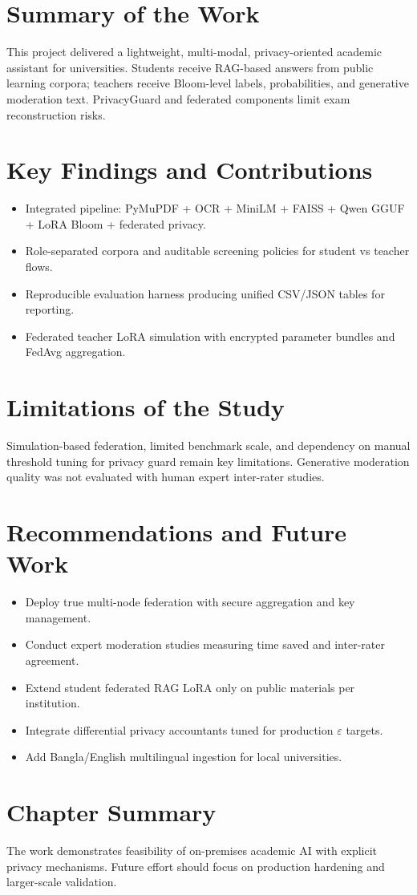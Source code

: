 
\section{Summary of the Work}
This project delivered a lightweight, multi-modal, privacy-oriented academic assistant for universities. Students receive RAG-based answers from public learning corpora; teachers receive Bloom-level labels, probabilities, and generative moderation text. PrivacyGuard and federated components limit exam reconstruction risks.

\section{Key Findings and Contributions}
\begin{itemize}
    \item Integrated pipeline: PyMuPDF + OCR + MiniLM + FAISS + Qwen GGUF + LoRA Bloom + federated privacy.
    \item Role-separated corpora and auditable screening policies for student vs teacher flows.
    \item Reproducible evaluation harness producing unified CSV/JSON tables for reporting.
    \item Federated teacher LoRA simulation with encrypted parameter bundles and FedAvg aggregation.
\end{itemize}

\section{Limitations of the Study}
Simulation-based federation, limited benchmark scale, and dependency on manual threshold tuning for privacy guard remain key limitations. Generative moderation quality was not evaluated with human expert inter-rater studies.

\section{Recommendations and Future Work}
\begin{itemize}
    \item Deploy true multi-node federation with secure aggregation and key management.
    \item Conduct expert moderation studies measuring time saved and inter-rater agreement.
    \item Extend student federated RAG LoRA only on public materials per institution.
    \item Integrate differential privacy accountants tuned for production $\varepsilon$ targets.
    \item Add Bangla/English multilingual ingestion for local universities.
\end{itemize}

\section{Chapter Summary}
The work demonstrates feasibility of on-premises academic AI with explicit privacy mechanisms. Future effort should focus on production hardening and larger-scale validation.
